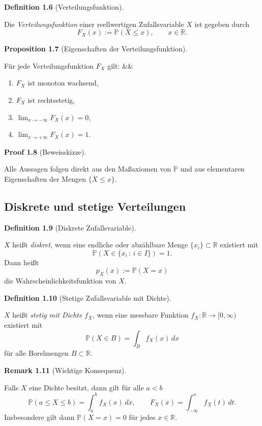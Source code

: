 \documentclass[10pt, letterpaper]{article}
\newcommand{\R}{\mathbb{R}}
\newenvironment{romanenum}[1][]
  {%
    \ifx&#1&
    \else
      \textbf{#1}\quad
    \fi
    \begin{enumerate}[label=\roman*)]
  }
  {%
    \end{enumerate}%
  }
\newcommand{\CustomHeading}[3]{%
  \par\medskip\noindent%
  \textbf{#1 #2} \textnormal{(#3)}.\enskip%
}
\newenvironment{DEF}[2]{\CustomHeading{Definition}{#1}{#2}}{}
\newenvironment{PROP}[2]{\CustomHeading{Proposition}{#1}{#2}}{}
\newenvironment{REM}[2]{\CustomHeading{Remark}{#1}{#2}}{}
\newenvironment{PROOF}[2]{\CustomHeading{Proof}{#1}{#2}}{}
\begin{document}
\begin{DEF}{1.6}{Verteilungsfunktion}
Die \emph{Verteilungsfunktion} einer reellwertigen Zufallsvariable \(X\) ist gegeben durch
\[
F_X(x):=\mathbb P(X\le x),\qquad x\in\R.
\]
\end{DEF}

\begin{PROP}{1.7}{Eigenschaften der Verteilungsfunktion}
Für jede Verteilungsfunktion \(F_X\) gilt:
\begin{romanenum}
    \item \(F_X\) ist monoton wachsend,
    \item \(F_X\) ist rechtsstetig,
    \item \(\lim_{x\to -\infty}F_X(x)=0\),
    \item \(\lim_{x\to +\infty}F_X(x)=1\).
\end{romanenum}
\end{PROP}

\begin{PROOF}{1.8}{Beweisskizze}
Alle Aussagen folgen direkt aus den Maßaxiomen von \(\mathbb P\) und aus elementaren Eigenschaften der Mengen \(\{X\le x\}\).
\end{PROOF}

\subsection{Diskrete und stetige Verteilungen}

\begin{DEF}{1.9}{Diskrete Zufallsvariable}
\(X\) heißt \emph{diskret}, wenn eine endliche oder abzählbare Menge \(\{x_i\}\subset\R\) existiert mit
\[
\mathbb P(X\in \{x_i\,:\,i\in I\})=1.
\]
Dann heißt
\[
p_X(x):=\mathbb P(X=x)
\]
die Wahrscheinlichkeitsfunktion von \(X\).
\end{DEF}

\begin{DEF}{1.10}{Stetige Zufallsvariable mit Dichte}
\(X\) heißt \emph{stetig mit Dichte} \(f_X\), wenn eine messbare Funktion \(f_X:\R\to [0,\infty)\) existiert mit
\[
\mathbb P(X\in B)=\int_B f_X(x)\,dx
\]
für alle Borelmengen \(B\subset\R\).
\end{DEF}

\begin{REM}{1.11}{Wichtige Konsequenz}
Falls \(X\) eine Dichte besitzt, dann gilt für alle \(a<b\)
\[
\mathbb P(a\le X\le b)=\int_a^b f_X(x)\,dx,
\qquad
F_X(x)=\int_{-\infty}^x f_X(t)\,dt.
\]
Insbesondere gilt dann \(\mathbb P(X=x)=0\) für jedes \(x\in\R\).
\end{REM}
\end{document}
